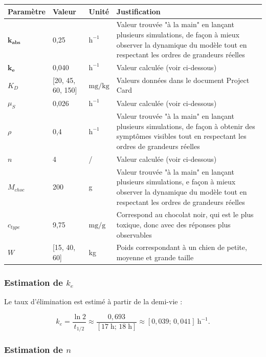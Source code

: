 \documentclass[11pt,a4paper]{article}
\begin{document}
\begin{center}
\begin{tabularx}{\textwidth}{p{2.5cm}p{3cm}p{3cm}>{\raggedright\arraybackslash}X}
\toprule
\textbf{Paramètre} & \textbf{Valeur} & \textbf{Unité} & \textbf{Justification} \\
\midrule
$\mathbf{k_{abs}}$ & 0,25 & $\mathrm{h^{-1}}$ & Valeur trouvée "à la main" en lançant plusieurs simulations, de façon à mieux observer la dynamique du modèle tout en respectant les ordres de grandeurs réelles \\
$\mathbf{k_{e}}$ & 0,040 & $\mathrm{h^{-1}}$ & Valeur calculée (voir ci-dessous) \\
$K_D$ & [20, 45, 60, 150] & $\mathrm{mg/kg}$ & Valeurs données dans le document Project Card \\
$\mu_S$ & 0,026 & $\mathrm{h^{-1}}$ & Valeur calculée (voir ci-dessous) \\
$\rho$ & 0,4 & $\mathrm{h^{-1}}$ & Valeur trouvée "à la main" en lançant plusieurs simulations, de façon à obtenir des symptômes visibles tout en respectant les ordres de grandeurs réelles \\
$n$ & 4 & / & Valeur calculée (voir ci-dessous) \\
$M_{choc}$ & 200 & g & Valeur trouvée "à la main" en lançant plusieurs simulations, e façon à mieux observer la dynamique du modèle tout en respectant les ordres de grandeurs réelles \\
$c_{type}$ & 9,75 & $\mathrm{mg/g}$ & Correspond au chocolat noir, qui est le plus toxique, donc avec des réponses plus observables \\
$W$ & [15, 40, 60] & kg & Poids correspondant à un chien de petite, moyenne et grande taille \\
\bottomrule
\end{tabularx}
\end{center}

\subsubsection{Estimation de \(k_e\)}

Le taux d'élimination est estimé à partir de la demi-vie :

\[
k_e = \frac{\ln 2}{t_{1/2}}
      \approx \frac{0{,}693}{[17 \; \text{h} ;\, 18 \; \text{h}]}
      \approx [0{,}039 ;\, 0{,}041]\ \mathrm{h^{-1}}.
\]


\subsubsection{Estimation de \(n\)}
\end{document}
